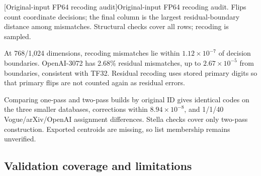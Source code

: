 \par\medskip\noindent\begin{minipage}{\linewidth}
\centering\captionsetup{hypcap=false}
[Original-input FP64 recoding audit]{Original-input FP64 recoding audit. Flips count coordinate
decisions; the final column is the largest residual-boundary distance
among mismatches. Structural checks cover all rows; recoding is sampled.}
\label{tab:4-representation-audit}
\scriptsize\setlength{\tabcolsep}{3pt}

\end{minipage}\par\medskip

At 768/1,024 dimensions, recoding mismatches lie within
$1.12\times10^{-7}$ of decision boundaries. OpenAI-3072 has 2.68\%
residual mismatches, up to $2.67\times10^{-5}$ from boundaries,
consistent with TF32. Residual recoding uses stored primary digits so
that primary flips are not counted again as residual errors.

Comparing one-pass and two-pass builds by original ID gives identical
codes on the three smaller databases, corrections within
$8.94\times10^{-8}$, and 1/1/40 Vogue/arXiv/OpenAI assignment differences.
Stella checks cover only two-pass construction. Exported centroids are
missing, so list membership remains unverified.

\subsection{Validation coverage and limitations}
\suppressfloats[t]

